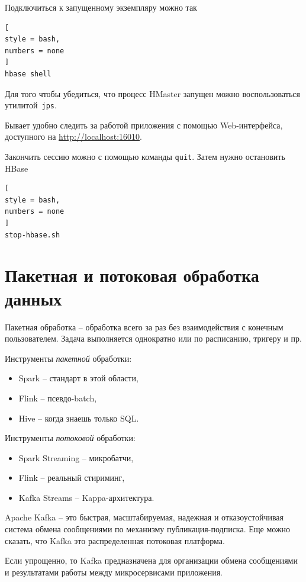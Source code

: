 \documentclass[%
	11pt,
	a4paper,
	utf8,
		]{article}
\begin{document}
Подключиться к запущенному экземпляру можно так
\begin{lstlisting}[
style = bash,
numbers = none	
]
hbase shell
\end{lstlisting}

Для того чтобы убедиться, что процесс HMaster запущен можно воспользоваться утилитой~\texttt{jps}.

Бывает удобно следить за работой приложения с помощью Web-интерфейса, доступного на \url{http://localhost:16010}.

Закончить сессию можно с помощью команды \texttt{quit}. Затем нужно остановить HBase
\begin{lstlisting}[
style = bash,
numbers = none
]
stop-hbase.sh
\end{lstlisting}




\section{Пакетная и потоковая обработка данных}

Пакетная обработка -- обработка всего за раз без взаимодействия с конечным пользователем. Задача выполняется однократно или по расписанию, тригеру и пр.

Инструменты \emph{пакетной} обработки:
\begin{itemize}
	\item Spark -- стандарт в этой области,
	
	\item Flink -- псевдо-batch,
	
	\item Hive -- когда знаешь только SQL.
\end{itemize}

Инструменты \emph{потоковой} обработки:
\begin{itemize}
	\item Spark Streaming -- микробатчи,
	
	\item Flink -- реальный стириминг,
	
	\item Kafka Streams -- Kappa-архитектура.
\end{itemize}

Apache Kafka -- это быстрая, масштабируемая, надежная и отказоустойчивая система обмена сообщениями по механизму публикация-подписка. Еще можно сказать, что Kafka это распределенная потоковая платформа.

Если упрощенно, то Kafka предназначена для организации обмена сообщениями и результатами работы между микросервисами приложения.
\end{document}
